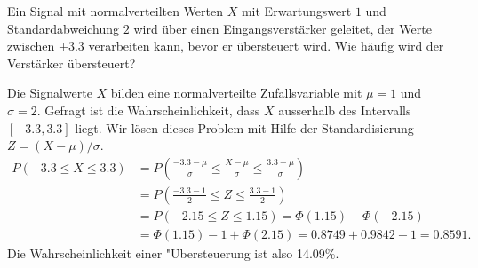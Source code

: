 Ein Signal mit normalverteilten Werten $X$ mit Erwartungswert
$1$ und Standardabweichung $2$ wird über einen Eingangsverstärker
geleitet, der Werte zwischen $\pm3.3$ verarbeiten kann, bevor
er übersteuert wird. Wie häufig wird der Verstärker übersteuert?


\begin{loesung}
Die Signalwerte $X$ bilden eine normalverteilte Zufallsvariable mit $\mu = 1$
und $\sigma=2$. Gefragt ist die Wahrscheinlichkeit, dass
$X$ ausserhalb des Intervalls $[-3.3, 3.3]$ liegt. Wir lösen dieses
Problem mit Hilfe der Standardisierung $Z=(X-\mu)/\sigma$.
\begin{align*}
P(-3.3\le X\le 3.3)
&=
P\left(
\frac{-3.3-\mu }{\sigma}
\le
\frac{X-\mu}{\sigma}
\le
\frac{3.3-\mu }{\sigma}
\right)
\\
&=
P\left(
\frac{-3.3-1}{2}
\le
Z
\le
\frac{3.3-1}{2}
\right)
\\
&=P(-2.15 \le Z \le 1.15)
=\Phi(1.15)-\Phi(-2.15)\\
&=\Phi(1.15)-1+\Phi(2.15)
=0.8749+0.9842 - 1=0.8591.
\end{align*}
Die Wahrscheinlichkeit einer "Ubersteuerung ist also 14.09\%.
\end{loesung}

